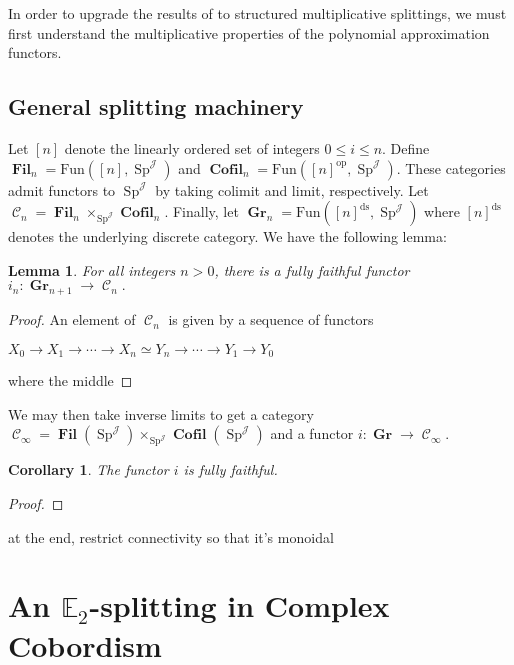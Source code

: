 \documentclass[reqno, oneside]{amsart}
\theoremstyle{definition}
\theoremstyle{plain}
\newtheorem{lem}[nul]{Lemma}
\newtheorem{cor}{Corollary}[nul]
\DeclareMathOperator{\C}{\mathcal{C}}
\DeclareMathOperator{\Gr}{\textbf{Gr}}
\DeclareMathOperator{\Fil}{\textbf{Fil}}
\DeclareMathOperator{\Sp}{\text{Sp}}
\DeclareMathOperator{\J}{\mathcal{J}}
\DeclareMathOperator{\Cofil}{\textbf{Cofil}}
\begin{document}
In order to upgrade the results of \cite{Arone} to structured multiplicative splittings, we must first understand the multiplicative properties of the polynomial approximation functors.  


\subsection{General splitting machinery}


Let $[n]$ denote the linearly ordered set of integers $0\leq i\leq n$.  Define $\Fil_n = \text{Fun}([n], \Sp^{\J})$ and $\Cofil_n = \text{Fun}([n]^{\text{op}},\Sp^{\J})$.  These categories admit functors to $\Sp^{\J}$ by taking colimit and limit, respectively.  Let $\C_n = \Fil_n \times_{\Sp^{\J}} \Cofil_n.$  Finally, let $\Gr_n = \text{Fun}([n]^{\text{ds}}, \Sp^{\J})$ where $[n]^{\text{ds}}$ denotes the underlying discrete category.  We have the following lemma:

\begin{lem}
For all integers $n>0$, there is a fully faithful functor $i_n:\Gr_{n+1} \to \C_n.$  
\end{lem}
\begin{proof}
An element of $\C_n$ is given by a sequence of functors 
\begin{center}
$X_0 \longrightarrow X_1 \longrightarrow \cdots \longrightarrow X_n \simeq Y_n \longrightarrow \cdots \longrightarrow Y_1 \longrightarrow Y_0$ 
\end{center}
where the middle 
\end{proof}

We may then take inverse limits to get a category $\C_\infty = \Fil(\Sp^{\J}) \times_{\Sp^{\J}} \Cofil(\Sp^{\J})$ and a functor $i: \Gr \to \C_\infty$. 

\begin{cor}
The functor $i$ is fully faithful.
\end{cor}
\begin{proof}
\end{proof}

at the end, restrict connectivity so that it's monoidal

\section{An \texorpdfstring{$\mathbb{E}_2$}{E2}-splitting in Complex Cobordism} \label{sec:MUE2}
\end{document}
